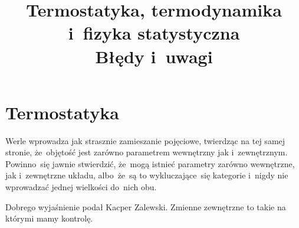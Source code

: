 \documentclass[a4paper,11pt]{article}
\title{Termostatyka, termodynamika i~fizyka statystyczna \\
  Błędy i~uwagi}
\begin{document}





\maketitle %





\section{Termostatyka}

\vspace{\spaceTwo}








\start {} Werle wprowadza jak strasznie zamieszanie pojęciowe,
twierdząc na tej samej stronie, że~objętość jest zarówno parametrem
wewnętrzny jak i~zewnętrznym. Powinno~się jawnie stwierdzić, że~mogą
istnieć parametry zarówno wewnętrzne, jak i~zewnętrzne układu,
albo~że~są to wykluczające~się kategorie i~nigdy nie wprowadzać jednej
wielkości do~nich obu.

Dobrego wyjaśnienie podał Kacper Zalewski. Zmienne zewnętrzne to takie
na którymi mamy kontrolę. 

\vspace{\spaceFour}



\start {}





\end{document}
